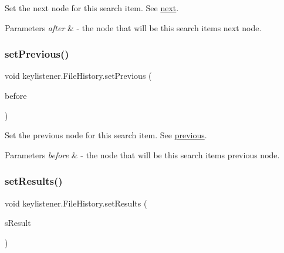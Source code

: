 Set the next node for this search item. See \hyperlink{classkeylistener_1_1_file_history_aa9571ba3eabdcc6b9e7d152a0a7537ee}{next}. 
\begin{DoxyParams}{Parameters}
{\em after} & -\/ the node that will be this search item\textquotesingle{}s next node. \\
\hline
\end{DoxyParams}
\mbox{\label{classkeylistener_1_1_file_history_ab3c4c436053b547e327b04b812a9870c}} 
\subsubsection{\texorpdfstring{set\+Previous()}{setPrevious()}}
{\footnotesize\ttfamily void keylistener.\+File\+History.\+set\+Previous (\begin{DoxyParamCaption}\item[{\hyperlink{classkeylistener_1_1_file_history}{File\+History}}]{before }\end{DoxyParamCaption})\hspace{0.3cm}{\ttfamily [inline]}}

Set the previous node for this search item. See \hyperlink{classkeylistener_1_1_file_history_ab08fec8e2a293a9000087d18e1454c44}{previous}. 
\begin{DoxyParams}{Parameters}
{\em before} & -\/ the node that will be this search item\textquotesingle{}s previous node. \\
\hline
\end{DoxyParams}
\mbox{\label{classkeylistener_1_1_file_history_a7e8911bcdd6a7483ba7e317692af39c9}} 
\subsubsection{\texorpdfstring{set\+Results()}{setResults()}}
{\footnotesize\ttfamily void keylistener.\+File\+History.\+set\+Results (\begin{DoxyParamCaption}\item[{String \mbox{[}$\,$\mbox{]}}]{s\+Result }\end{DoxyParamCaption})\hspace{0.3cm}{\ttfamily [inline]}}

